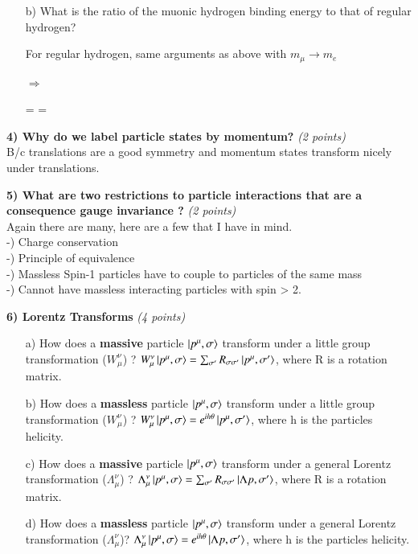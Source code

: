 {\begin{itemize}
Can get E from plugging this back into either of the two terms.

\be
E \sim {} \sim \alpha^2 m_\mu \sim 10^{-4}\ 10^{-1}\ GeV = 10^{-5}\ GeV
\ee

\item[b)] What is the ratio of the muonic hydrogen binding energy to that of regular hydrogen?

For regular hydrogen, same arguments as above with $m_\mu \rightarrow m_e$

$\Rightarrow$

\be
{} =  =  
\ee

\end{itemize}


\textbf{4) Why do we label particle states by momentum? } \hfill \textit{(2 points)}\\

B/c translations are a good symmetry and momentum states transform nicely under translations.



\textbf{5) What are two restrictions to particle interactions that are a consequence gauge invariance ? }\hfill \textit{(2 points)}\\

Again there are many, here are a few that I have in mind.\\
-) Charge conservation\\
-) Principle of equivalence\\
-) Massless Spin-1 particles have to couple to particles of the same mass\\
-) Cannot have massless interacting particles with spin > 2.

\textbf{6) Lorentz Transforms } \hfill \textit{(4 points)}\\
\begin{itemize}
\item[a)] How does a \textbf{massive} particle $\ket{p^\mu,\sigma}$ transform under a little group transformation ($W_\mu^\nu$)  ?
$W_\mu^\nu \ket{p^\mu,\sigma} = \sum_{\sigma'} R_{\sigma \sigma'} \ket{p^\mu,\sigma'}$, where R is a rotation matrix.
\item[b)] How does a \textbf{massless} particle $\ket{p^\mu,\sigma}$ transform under a little group transformation ($W_\mu^\nu$)  ?
$W_\mu^\nu \ket{p^\mu,\sigma} = e^{ih\theta} \ket{p^\mu,\sigma'}$, where h is the particles helicity.
\item[c)] How does a \textbf{massive} particle $\ket{p^\mu,\sigma}$ transform under a general Lorentz transformation ($\Lambda_\mu^\nu$) ?
$\Lambda_\mu^\nu \ket{p^\mu,\sigma} = \sum_{\sigma'} R_{\sigma \sigma'} \ket{\Lambda p,\sigma'}$, where R is a rotation matrix.
\item[d)] How does a \textbf{massless} particle $\ket{p^\mu,\sigma}$ transform under a general Lorentz transformation ($\Lambda_\mu^\nu$)?
$\Lambda_\mu^\nu \ket{p^\mu,\sigma} = e^{ih\theta} \ket{\Lambda p,\sigma'}$, where h is the particles helicity.
\end{itemize}


}
